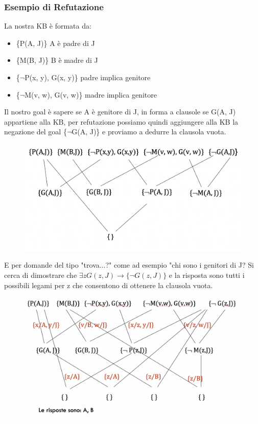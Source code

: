 \documentclass{article}
\begin{document}
\subsubsection{Esempio di Refutazione}
La nostra KB è formata da:
\begin{itemize}
    \item \{P(A, J)\} A è padre di J
    \item \{M(B, J)\} B è madre di J
    \item \{$\neg$P(x, y), G(x, y)\} padre implica genitore
    \item \{$\neg$M(v, w), G(v, w)\} madre implica genitore
\end{itemize} \clearpage
Il nostro goal è sapere se A è genitore di J, in forma a clausole se G(A, J) appartiene alla KB, per refutazione possiamo quindi aggiungere alla KB la negazione del goal \{$\neg$G(A, J)\} e proviamo a dedurre la clausola vuota.
\begin{figure}[H]
\centering
\includegraphics[scale=0.4]{Images/refutazioneesempio.png}
\end{figure}
E per domande del tipo "trova...?" come ad esempio "chi sono i genitori di J? \newline
Si cerca di dimostrare che $\exists z G(z,J) \rightarrow \{\neg G(z,J)\}$ e la risposta sono tutti i possibili legami per z che consentono di ottenere la clausola vuota.
\begin{figure}[H]
\centering
\includegraphics[scale=0.4]{Images/refutazioneesempio2.png}
\end{figure}
















%
%
\end{document}
